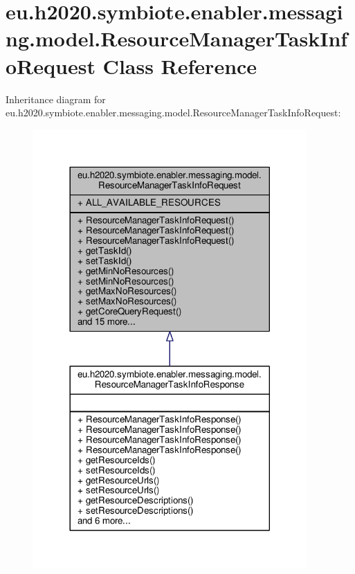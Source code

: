 \hypertarget{classeu_1_1h2020_1_1symbiote_1_1enabler_1_1messaging_1_1model_1_1ResourceManagerTaskInfoRequest}{}\section{eu.\+h2020.\+symbiote.\+enabler.\+messaging.\+model.\+Resource\+Manager\+Task\+Info\+Request Class Reference}
\label{classeu_1_1h2020_1_1symbiote_1_1enabler_1_1messaging_1_1model_1_1ResourceManagerTaskInfoRequest}


Inheritance diagram for eu.\+h2020.\+symbiote.\+enabler.\+messaging.\+model.\+Resource\+Manager\+Task\+Info\+Request\+:
\nopagebreak
\begin{figure}[H]
\begin{center}
\leavevmode
\includegraphics[width=296pt]{classeu_1_1h2020_1_1symbiote_1_1enabler_1_1messaging_1_1model_1_1ResourceManagerTaskInfoRequest__inherit__graph}
\end{center}
\end{figure}


